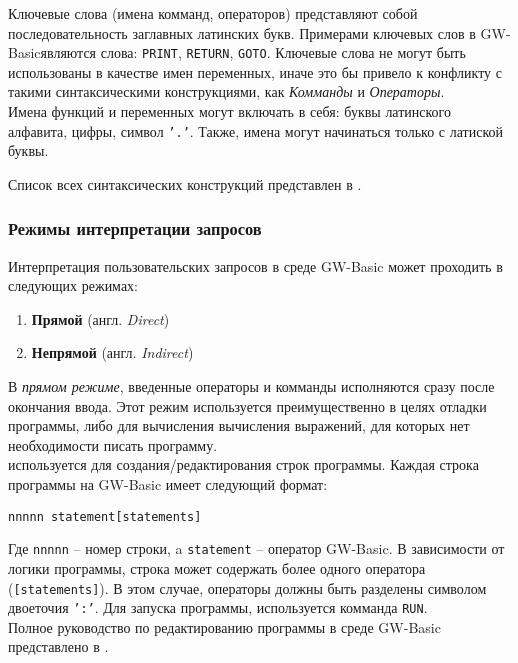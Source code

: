 \documentclass[12pt]{article}
\begin{document}
			\indent Ключевые слова (имена комманд, операторов) представляют собой последовательность заглавных латинских букв. Примерами ключевых слов в GW-Basicявляются слова: {\tt PRINT}, {\tt RETURN}, {\tt GOTO}. Ключевые слова не могут быть использованы в качестве имен переменных, иначе это бы привело к конфликту с такими синтаксическими конструкциями, как {\it Комманды} и {\it Операторы}. \\
			\indent Имена функций и переменных могут включать в себя: буквы латинского алфавита, цифры, символ {\tt '.'}. Также, имена могут начинаться только с латиской буквы.
			
			\indent Список всех синтаксических конструкций представлен в \cite[стр.~117]{basicManual}.
			\subsubsection{Режимы интерпретации запросов}
			\label{subsec:interpTypes}
			\hspace{\parindent} Интерпретация пользовательских запросов в среде GW-Basic может проходить в следующих режимах:
			\begin{enumerate}
				\item {\bf Прямой} (англ. {\it Direct}) 
				\item {\bf Непрямой} (англ. {\it Indirect}) 
			\end{enumerate}
			
			\indent В {\it прямом режиме}, введенные операторы и комманды исполняются сразу после окончания ввода. Этот режим используется преимущественно в целях отладки программы, либо для вычисления вычисления выражений, для которых нет необходимости писать программу. \\
			 используется для создания/редактирования строк программы. Каждая строка программы на GW-Basic имеет следующий формат:
			\begin{center}
				\tt nnnnn statement[statements]
			\end{center}

			\indent	Где {\tt nnnnn} -- номер строки, a {\tt statement} -- оператор GW-Basic. В зависимости от логики программы, строка может содержать более одного оператора ({\tt [statements]}). В этом случае, операторы должны быть разделены символом двоеточия {\tt ':'}. Для запуска программы, используется комманда {\tt RUN}.\\
			\indent Полное руководство по редактированию программы в среде GW-Basic представлено в \cite[стр.~18]{basicManual}.
\end{document}
